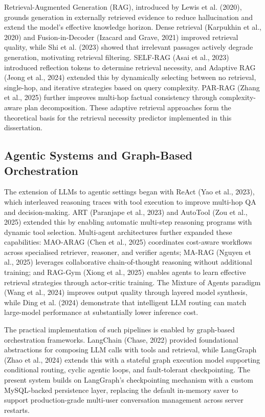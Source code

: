 \documentclass[12pt,a4paper]{article}
\begin{document}
Retrieval-Augmented Generation (RAG), introduced by Lewis et al. (2020), grounds generation in externally retrieved evidence to reduce hallucination and extend the model's effective knowledge horizon. Dense retrieval (Karpukhin et al., 2020) and Fusion-in-Decoder (Izacard and Grave, 2021) improved retrieval quality, while Shi et al. (2023) showed that irrelevant passages actively degrade generation, motivating retrieval filtering. SELF-RAG (Asai et al., 2023) introduced reflection tokens to determine retrieval necessity, and Adaptive RAG (Jeong et al., 2024) extended this by dynamically selecting between no retrieval, single-hop, and iterative strategies based on query complexity. PAR-RAG (Zhang et al., 2025) further improves multi-hop factual consistency through complexity-aware plan decomposition. These adaptive retrieval approaches form the theoretical basis for the retrieval necessity predictor implemented in this dissertation.

\subsection{Agentic Systems and Graph-Based Orchestration}
\label{subsec:agentic_orchestration}

The extension of LLMs to agentic settings began with ReAct (Yao et al., 2023), which interleaved reasoning traces with tool execution to improve multi-hop QA and decision-making. ART (Paranjape et al., 2023) and AutoTool (Zou et al., 2025) extended this by enabling automatic multi-step reasoning programs with dynamic tool selection. Multi-agent architectures further expanded these capabilities: MAO-ARAG (Chen et al., 2025) coordinates cost-aware workflows across specialised retriever, reasoner, and verifier agents; MA-RAG (Nguyen et al., 2025) leverages collaborative chain-of-thought reasoning without additional training; and RAG-Gym (Xiong et al., 2025) enables agents to learn effective retrieval strategies through actor-critic training. The Mixture of Agents paradigm (Wang et al., 2024) improves output quality through layered model synthesis, while Ding et al. (2024) demonstrate that intelligent LLM routing can match large-model performance at substantially lower inference cost.

The practical implementation of such pipelines is enabled by graph-based orchestration frameworks. LangChain (Chase, 2022) provided foundational abstractions for composing LLM calls with tools and retrieval, while LangGraph (Zhao et al., 2024) extends this with a stateful graph execution model supporting conditional routing, cyclic agentic loops, and fault-tolerant checkpointing. The present system builds on LangGraph's checkpointing mechanism with a custom MySQL-backed persistence layer, replacing the default in-memory saver to support production-grade multi-user conversation management across server restarts.
\end{document}
